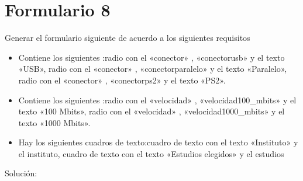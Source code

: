 \documentclass[letterpaper,10pt,spanish]{sphinxmanual}
\begin{document}
\section{Formulario 8}
\label{\detokenize{ejercicios/formularios/anexo_formularios:formulario-8}}
Generar el formulario siguiente de acuerdo a los siguientes requisitos
\begin{itemize}
\item {} 
Contiene los siguientes :radio con el   «conector» ,   «conectorusb»  y el texto «USB», radio con el   «conector» ,   «conectorparalelo»  y el texto «Paralelo», radio con el   «conector» ,   «conectorps2»  y el texto «PS2».

\item {} 
Contiene los siguientes :radio con el   «velocidad» ,   «velocidad100\_mbits»  y el texto «100 Mbits», radio con el   «velocidad» ,   «velocidad1000\_mbits»  y el texto «1000 Mbits».

\item {} 
Hay los siguientes cuadros de texto:cuadro de texto con el texto «Instituto» y el  instituto, cuadro de texto con el texto «Estudios elegidos» y el  estudios

\end{itemize}


Solución:
\end{document}
